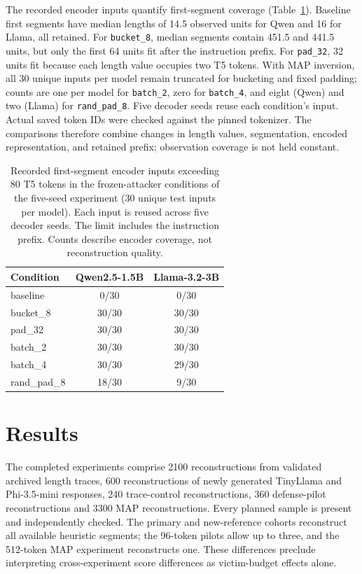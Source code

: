 \documentclass[electronics,article,submit,pdftex,moreauthors]{Definitions/mdpi}
\begin{document}
The recorded encoder inputs quantify first-segment coverage (Table~\ref{tab:encoder_coverage}). Baseline first segments have median lengths of 14.5 observed units for Qwen and 16 for Llama, all retained. For \texttt{bucket\_8}, median segments contain 451.5 and 441.5 units, but only the first 64 units fit after the instruction prefix. For \texttt{pad\_32}, 32 units fit because each length value occupies two T5 tokens. With MAP inversion, all 30 unique inputs per model remain truncated for bucketing and fixed padding; counts are one per model for \texttt{batch\_2}, zero for \texttt{batch\_4}, and eight (Qwen) and two (Llama) for \texttt{rand\_pad\_8}. Five decoder seeds reuse each condition's input. Actual saved token IDs were checked against the pinned tokenizer. The comparisons therefore combine changes in length values, segmentation, encoded representation, and retained prefix; observation coverage is not held constant.

\begin{table}[ht]
\centering
\caption{Recorded first-segment encoder inputs exceeding 80 T5 tokens in the frozen-attacker conditions of the five-seed experiment (30 unique test inputs per model). Each input is reused across five decoder seeds. The limit includes the instruction prefix. Counts describe encoder coverage, not reconstruction quality.}
\label{tab:encoder_coverage}
\begin{tabular}{l c c}
\toprule
Condition & Qwen2.5-1.5B & Llama-3.2-3B \\
\midrule
baseline & 0/30 & 0/30 \\
bucket\_8 & 30/30 & 30/30 \\
pad\_32 & 30/30 & 30/30 \\
batch\_2 & 30/30 & 30/30 \\
batch\_4 & 30/30 & 29/30 \\
rand\_pad\_8 & 18/30 & 9/30 \\
\bottomrule
\end{tabular}
\end{table}

\section{Results}
The completed experiments comprise 2100 reconstructions from validated archived length traces, 600 reconstructions of newly generated TinyLlama and Phi-3.5-mini responses, 240 trace-control reconstructions, 360 defense-pilot reconstructions and 3300 MAP reconstructions. Every planned sample is present and independently checked. The primary and new-reference cohorts reconstruct all available heuristic segments; the 96-token pilots allow up to three, and the 512-token MAP experiment reconstructs one. These differences preclude interpreting cross-experiment score differences as victim-budget effects alone.
\end{document}
